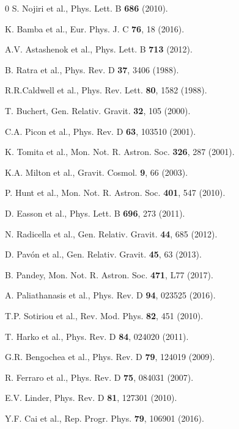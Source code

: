 \documentclass[showpacs,aps,amssymb,preprintnumbers,prd,amsmath,floatfix]{revtex4}
\begin{document}
\begin{thebibliography}{0}
S. Nojiri et al., Phys. Lett. B \textbf{686} (2010).

K. Bamba et al., Eur. Phys. J. C \textbf{76}, 18 (2016).

A.V. Astashenok et al., Phys. Lett. B \textbf{713} (2012). 

B. Ratra et al., Phys. Rev. D \textbf{37}, 3406 (1988).

R.R.Caldwell et al., Phys. Rev. Lett. \textbf{80}, 1582 (1988).

T. Buchert, Gen. Relativ. Gravit. \textbf{32}, 105 (2000).

C.A. Picon et al., Phys. Rev. D \textbf{63}, 103510 (2001).

K. Tomita et al., Mon. Not. R. Astron. Soc. \textbf{326}, 287 (2001).

K.A. Milton et al., Gravit. Cosmol. \textbf{9}, 66 (2003).

P. Hunt et al., Mon. Not. R. Astron. Soc. \textbf{401}, 547 (2010).

D. Easson et al., Phys. Lett. B \textbf{696}, 273 (2011).

N. Radicella et al., Gen. Relativ. Gravit. \textbf{44}, 685 (2012).

D. Pavón et al., Gen. Relativ. Gravit. \textbf{45}, 63 (2013).

B. Pandey, Mon. Not. R. Astron. Soc. \textbf{471}, L77 (2017).


A. Paliathanasis et al., Phys. Rev. D \textbf{94}, 023525 (2016).

T.P. Sotiriou et al., Rev. Mod. Phys. \textbf{82}, 451 (2010).

T. Harko et al., Phys. Rev. D \textbf{84}, 024020 (2011).


G.R. Bengochea et al., Phys. Rev. D \textbf{79}, 124019 (2009).

R. Ferraro et al., Phys. Rev. D \textbf{75}, 084031 (2007).

E.V. Linder, Phys. Rev. D \textbf{81}, 127301 (2010).

Y.F. Cai et al., Rep. Progr. Phys. \textbf{79}, 106901 (2016).


\end{thebibliography}
\end{document}
